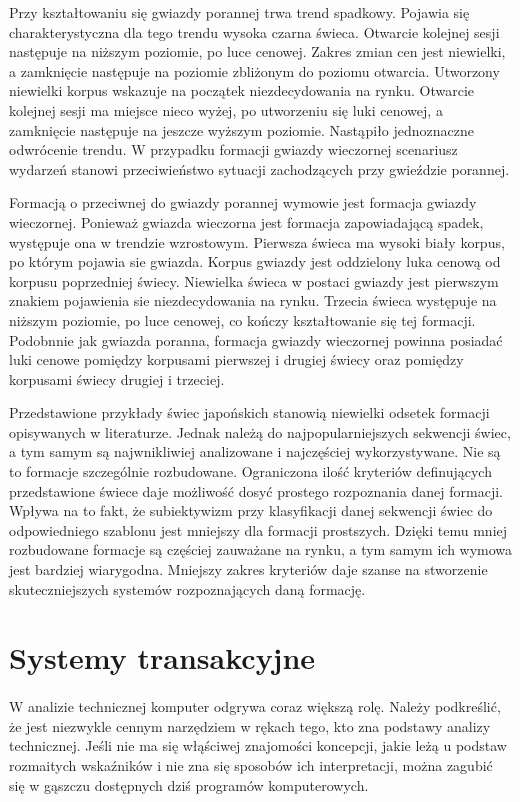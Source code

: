 \documentclass[pdflatex,11pt]{aghdpl}
\begin{document}
Przy kształtowaniu się gwiazdy porannej trwa trend spadkowy. Pojawia się charakterystyczna dla tego trendu wysoka czarna świeca. Otwarcie kolejnej sesji następuje na niższym poziomie, po luce cenowej. Zakres zmian cen jest niewielki, a zamknięcie następuje na poziomie zbliżonym do poziomu otwarcia. Utworzony niewielki korpus wskazuje na początek niezdecydowania na rynku. Otwarcie kolejnej sesji ma miejsce nieco wyżej, po utworzeniu się luki cenowej, a zamknięcie następuje na jeszcze wyższym poziomie. Nastąpiło jednoznaczne odwrócenie trendu. W przypadku formacji gwiazdy wieczornej scenariusz wydarzeń stanowi przeciwieństwo sytuacji zachodzących przy gwieździe porannej.

Formacją o przeciwnej do gwiazdy porannej wymowie jest formacja gwiazdy wieczornej. Ponieważ gwiazda wieczorna jest formacja zapowiadającą spadek, występuje ona w trendzie wzrostowym. Pierwsza świeca ma wysoki biały korpus, po którym pojawia sie gwiazda. Korpus gwiazdy jest oddzielony luka cenową od korpusu poprzedniej świecy. Niewielka świeca w postaci gwiazdy jest pierwszym znakiem pojawienia sie niezdecydowania na rynku. Trzecia świeca występuje na niższym poziomie, po luce cenowej, co kończy kształtowanie się tej formacji. Podobnnie jak gwiazda poranna, formacja gwiazdy wieczornej powinna posiadać luki cenowe pomiędzy korpusami pierwszej i drugiej świecy oraz pomiędzy korpusami świecy drugiej i trzeciej.

Przedstawione przykłady świec japońskich stanowią niewielki odsetek formacji opisywanych w literaturze. Jednak należą do najpopularniejszych sekwencji świec, a tym samym są najwnikliwiej analizowane i najczęściej wykorzystywane. Nie są to formacje szczególnie rozbudowane. Ograniczona ilość kryteriów definujących przedstawione świece daje możliwość dosyć prostego rozpoznania danej formacji. Wpływa na to fakt, że subiektywizm przy klasyfikacji danej sekwencji świec do odpowiedniego szablonu jest mniejszy dla formacji prostszych. Dzięki temu mniej rozbudowane formacje są częściej zauważane na rynku, a tym samym ich wymowa jest bardziej wiarygodna. Mniejszy zakres kryteriów daje szanse na stworzenie skuteczniejszych systemów rozpoznających daną formację.  
 
\section{Systemy transakcyjne}
\paragraph{}
W analizie technicznej komputer odgrywa coraz większą rolę. Należy podkreślić, że jest niezwykle cennym narzędziem w rękach tego, kto zna podstawy analizy technicznej. Jeśli nie ma się włąściwej znajomości koncepcji, jakie leżą u podstaw rozmaitych wskaźników i nie zna się sposobów ich interpretacji, można zagubić się w gąszczu dostępnych dziś programów komputerowych\cite{8}.
\end{document}
